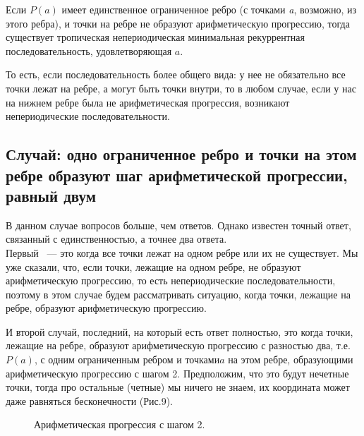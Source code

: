 \documentclass[russian]{lecture-notes}
\begin{document}
\begin{Corollary}
	Если $P(a)$ имеет единственное ограниченное ребро (с точками {\itshape a}, возможно, из этого ребра), и точки на ребре не образуют арифметическую
	прогрессию, тогда существует тропическая непериодическая минимальная рекуррентная
	последовательность, удовлетворяющая $a$.\\
\end{Corollary}


То есть, если последовательность более общего вида: у нее не обязательно все точки лежат на ребре, а могут быть точки внутри, то в любом случае, если у нас на нижнем ребре была не арифметическая прогрессия, возникают непериодические последовательности.

\subsection{ Случай: одно ограниченное ребро и точки на этом ребре образуют шаг арифметической прогрессии, равный двум}

В данном случае вопросов больше, чем ответов. Однако известен точный ответ, связанный с единственностью, а точнее два ответа. \\

Первый ~--- это когда
все точки лежат на одном ребре или их не существует. Мы уже сказали, что, если точки, лежащие на одном ребре, не образуют
арифметическую прогрессию, то есть непериодические последовательности, поэтому в этом случае будем рассматривать ситуацию, когда
точки, лежащие на ребре, образуют арифметическую прогрессию.

И второй случай, последний, на который есть ответ полностью, это когда точки, лежащие на ребре, образуют арифметическую прогрессию с разностью два, т.е. $P(a)$, с одним ограниченным ребром и точками$a$ на этом ребре, образующими арифметическую прогрессию с шагом 2. Предположим, что это будут нечетные точки, тогда про остальные (четные) мы ничего не знаем, их координата может даже равняться бесконечности (Рис.9).

\begin{figure}[h!]
\caption{Арифметическая прогрессия с шагом 2.} 
\end{figure}
\end{document}
